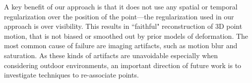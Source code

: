 \documentclass[10pt,twocolumn,letterpaper]{article}
\begin{document}

A key benefit of our approach is that it does not use any spatial or temporal regularization over the position of the point---the regularization used in our approach is over visibility. This results in ``faithful" reconstruction of 3D point motion, that is not biased or smoothed out by prior models of deformation. The most common cause of failure are imaging artifacts, such as motion blur and saturation. As these kinds of artifacts are unavoidable especially when considering outdoor environments, an important direction of future work is to investigate techniques to re-associate points. 




\end{document}
